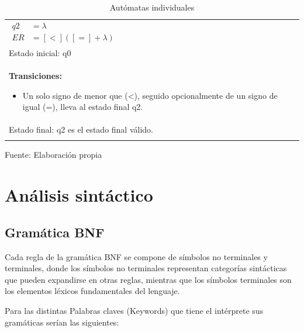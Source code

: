 \begin{center}
\begin{longtable}{|l|l|}
{\begin{minipage}{0.95\textwidth}
\begin{math}
\begin{array}{rl}
            q2 & = \lambda \\
            ER & = [<]([=] + \lambda)
          \end{array}
        \end{math}
      \end{minipage}
    } \\
    \multicolumn{2}{|l|}{Estado inicial: q0} \\
    \multicolumn{2}{|l|}{
      \begin{minipage}{0.9\textwidth
      }
        \textbf{Transiciones:}
        \vspace*{-1.5em}
        \begin{itemize}
          \item Un solo signo de menor que (<), seguido opcionalmente de un signo de igual (=), lleva al estado final q2.
        \end{itemize}
      \end{minipage}
    } \\
    \multicolumn{2}{|l|}{Estado final: q2 es el estado final válido.} \\
    \hline
    \caption{Autómatas individuales}
    \label{tab:automatas}
  \end{longtable}
  \vspace*{-2.5em}
  \centering Fuente: Elaboración propia
\end{center}

\section{Análisis sintáctico}
\subsection{Gramática BNF}
Cada regla de la gramática BNF se compone de símbolos no terminales y terminales, donde los símbolos no terminales representan categorías sintácticas que pueden expandirse en otras reglas, mientras que los símbolos terminales son los elementos léxicos fundamentales del lenguaje.

Para las distintas Palabras claves (Keywords) que tiene el intérprete sus gramáticas serían las siguientes:

